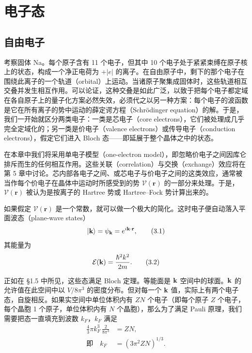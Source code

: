 
\chapter{电子态}


\section{自由电子}

考察固体 Na。每个原子含有 11 个电子，但其中 10 个电子处于紧紧束缚在原子核上的状态，构成一个净正电荷为 $+|e|$ 的离子。在自由原子中，剩下的那个电子在围绕此离子的一个轨道（orbital）上运动。当诸原子聚集成固体时，这些轨道相互交叠并发生相互作用。可以论证，这种交叠是如此广泛，以致于把每个电子都定域在各自原子上的量子化方案必然失效，必须代之以另一种方案：每个电子的波函数是它在所有离子的势中运动的薛定谔方程（Schrödinger equation）的解。于是，我们一开始就区分两类电子：一类是芯电子（core electrons），它们被处理成几乎完全定域化的；另一类是价电子（valence electrons）或传导电子（conduction electrons），假定它们进入 Bloch 态——即延展于整个晶体之中的状态。

在本章中我们将采用单电子模型（one-electron model），即忽略价电子之间因库仑排斥而生的任何相互作用。这些关联（correlation）与交换（exchange）效应将在第 5 章中讨论。芯内部各电子之间、或芯电子与价电子之间的这类效应，通常被当作每个价电子在晶体中运动时所感受到的势 $\mathcal{V}(\mathbf{r})$ 的一部分来处理。于是，$\mathcal{V}(\mathbf{r})$ 被认为是按离子的 Hartree 势或 Hartree--Fock 势计算出来的。

如果假定 $\mathcal{V}(\mathbf{r})$ 是一个常数，就可以做一个极大的简化。这时电子便自动落入平面波态（plane-wave states）
\begin{equation*}
|{\bf k}\rangle=\psi_{\bf k}=e^{i{\bf k}\cdot{\bf r}},
\tag{3.1}
\end{equation*}
其能量为
\begin{equation*}
\mathcal{E}({\bf k})=\frac{\hbar^{2}k^{2}}{2m}.
\tag{3.2}
\end{equation*}

正如在 §1.5 中所见，这些态满足 Bloch 定理。等能面是 ${\bf k}$ 空间中的球面。${\bf k}$ 的允许值在此空间中以 $V/8\pi^{3}$ 的密度分布。但对每一个 ${\bf k}$ 值，实际上有两个电子态，自旋相反。如果实空间中单位体积内有 $ZN$ 个电子（即每个原子 $Z$ 个电子，每个晶胞 1 个原子，单位体积内有 $N$ 个晶胞），那么为了满足 Pauli 原理，我们需要把态一直填充到波数 $k_{F}$，$k_{F}$ 满足
\begin{align*}
\frac{4}{3}\pi k_{F}^{3}\,\frac{2}{8\pi^{3}}&=ZN,\\
\text{即}\quad k_{F}&=(3\pi^{2}ZN)^{1/3}.
\tag{3.3}
\end{align*}

